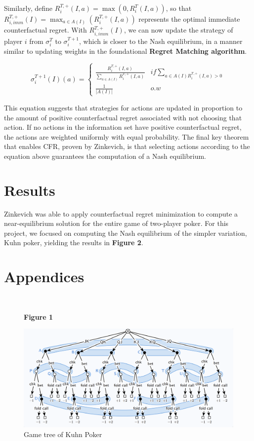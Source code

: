 \documentclass{article}
\begin{document}
Similarly, define \( R_{i}^{T,+}(I, a) = \max(0, R_{i}^T(I,a)) \), so that \( R^{T,+}_{i,imm}(I) = \max_{a \in A(I)}(R^{T,+}_i(I,a)) \) represents the optimal immediate counterfactual regret. With \( R^{T,+}_{i,imm}(I) \), we can now update the strategy of player $i$ from \( \sigma^T_i \) to \( \sigma^{T+1}_i \), which is closer to the Nash equilibrium, in a manner similar to updating weights in the foundational \textbf{Regret Matching algorithm}.

\[ 
\sigma_i^{T+1}(I)(a) = 
\begin{cases} 
      \frac{R_i^{T,+}(I,a)}{\sum_{a \in A(I)} R_i^{T,+}(I,a)} & if \sum_{a \in A(I) R_i^{T,+}(I,a) > 0} \\
      \frac{1}{|A(I)|} & o.w 
   \end{cases}
\]

This equation suggests that strategies for actions are updated in proportion to the amount of positive counterfactual regret associated with not choosing that action. If no actions in the information set have positive counterfactual regret, the actions are weighted uniformly with equal probability. The final key theorem that enables CFR, proven by Zinkevich, is that selecting actions according to the equation above guarantees the computation of a Nash equilibrium.





\section{Results}
Zinkevich was able to apply counterfactual regret minimization to compute a near-equilibrium solution for the entire game of two-player poker. For this project, we focused on computing the Nash equilibrium of the simpler variation, Kuhn poker, yielding the results in \textbf{Figure 2}.





\newpage
\section{Appendices}
\
\begin{figure}[H]
    \centering
    \textbf{Figure 1}\par\medskip
\includegraphics[scale=.44]{game_tree}
    \caption{Game tree of Kuhn Poker \cite{Farina}}
\end{figure}
\end{document}
